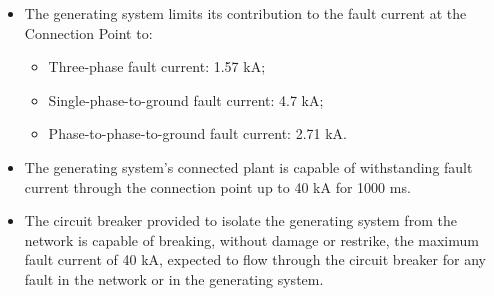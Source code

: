 \begin{itemize}
	\item The generating system limits its contribution to the fault current at the Connection Point to:
	\begin{itemize}
		\item Three-phase fault current: 1.57 kA;
		\item Single-phase-to-ground fault current: 4.7 kA;
		\item Phase-to-phase-to-ground fault current: 2.71 kA.
	\end{itemize}
	\item The generating system’s connected plant is capable of withstanding fault current through the connection point up to 40 kA for 1000 ms.
	\item The circuit breaker provided to isolate the generating system from the network is capable of breaking, without damage or restrike, the maximum fault current of 40 kA, expected to flow through the circuit breaker for any fault in the network or in the generating system.
\end{itemize}
